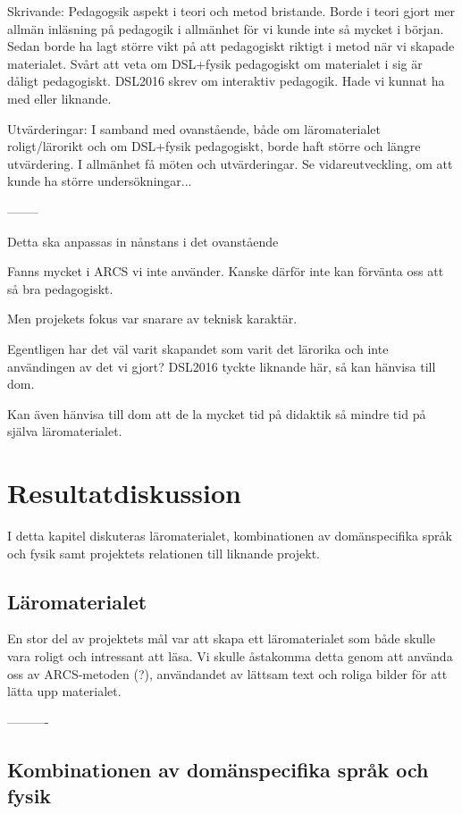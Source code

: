 \begin{binge}
Skrivande: Pedagogsik aspekt i teori och metod bristande. Borde i teori gjort mer allmän inläsning på pedagogik i allmänhet för vi kunde inte så mycket i början. Sedan borde ha lagt större vikt på att pedagogiskt riktigt i metod när vi skapade materialet. Svårt att veta om DSL+fysik pedagogiskt om materialet i sig är dåligt pedagogiskt. DSL2016 skrev om interaktiv pedagogik. Hade vi kunnat ha med eller liknande.

Utvärderingar: I samband med ovanstående, både om läromaterialet roligt/lärorikt och om DSL+fysik pedagogiskt, borde haft större och längre utvärdering. I allmänhet få möten och utvärderingar. Se vidareutveckling, om att kunde ha större undersökningar...

--------

Detta ska anpassas in nånstans i det ovanstående

Fanns mycket i ARCS vi inte använder. Kanske därför inte kan förvänta oss att så bra pedagogiskt.

Men projekets fokus var snarare av teknisk karaktär.

Egentligen har det väl varit skapandet som varit det lärorika och inte användingen av det vi gjort? DSL2016 tyckte liknande här, så kan hänvisa till dom.

Kan även hänvisa till dom att de la mycket tid på didaktik så mindre tid på själva läromaterialet.




\section{Resultatdiskussion}

I detta kapitel diskuteras läromaterialet, kombinationen av domänspecifika språk och fysik samt projektets relationen till liknande projekt.

\subsection{Läromaterialet}

En stor del av projektets mål var att skapa ett läromaterialet som både skulle
vara roligt och intressant att läsa. Vi skulle åstakomma detta genom att använda
oss av ARCS-metoden (?), användandet av lättsam text och roliga bilder för att
lätta upp materialet. 


----------

\subsection{Kombinationen av domänspecifika språk och fysik}


\end{binge}
